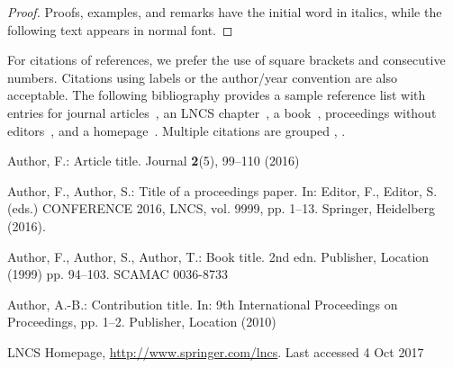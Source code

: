 \documentclass[runningheads]{llncs}
\begin{document}
\begin{thebibliography}{8}
%
%
\begin{proof}
Proofs, examples, and remarks have the initial word in italics,
while the following text appears in normal font.
\end{proof}
For citations of references, we prefer the use of square brackets
and consecutive numbers. Citations using labels or the author/year
convention are also acceptable. The following bibliography provides
a sample reference list with entries for journal
articles~\cite{ref_article}, an LNCS chapter~\cite{ref_lncs}, a
book~\cite{ref_book}, proceedings without editors~\cite{ref_proc},
and a homepage~\cite{ref_url}. Multiple citations are grouped
\cite{ref_article,ref_lncs,ref_book},
\cite{ref_article,ref_book,ref_proc1,ref_url}.
%
%
%
% 
% 
%

Author, F.: Article title. Journal \textbf{2}(5), 99--110 (2016)

Author, F., Author, S.: Title of a proceedings paper. In: Editor,
F., Editor, S. (eds.) CONFERENCE 2016, LNCS, vol. 9999, pp. 1--13.
Springer, Heidelberg (2016). 

Author, F., Author, S., Author, T.: Book title. 2nd edn. Publisher,
Location (1999) pp. 94–103. SCAMAC 0036-8733

Author, A.-B.: Contribution title. In: 9th International Proceedings
on Proceedings, pp. 1--2. Publisher, Location (2010)

LNCS Homepage, \url{http://www.springer.com/lncs}. Last accessed 4
Oct 2017
\end{thebibliography}
\end{document}
